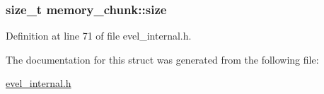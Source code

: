 \subsubsection[{size}]{\setlength{\rightskip}{0pt plus 5cm}size\+\_\+t memory\+\_\+chunk\+::size}\label{structmemory__chunk_abf98e30fa06d9af77beb446660be9c27}


Definition at line 71 of file evel\+\_\+internal.\+h.



The documentation for this struct was generated from the following file\+:\begin{DoxyCompactItemize}
\item 
\hyperlink{evel__internal_8h}{evel\+\_\+internal.\+h}\end{DoxyCompactItemize}

